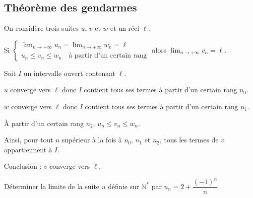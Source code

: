 \documentclass[french]{book}
\newcommand{\N}{\mathbb {N}}
\newcommand{\ie}{\leq}
\newcommand{\limn}{\lim_{n\rightarrow +\infty}}
\begin{document}
\subsection{Théorème des gendarmes}

\begin{prop}
On considère trois suites $u$, $v$ et $w$ et un réel $\ell$.
\par Si \quad
$\left\{\begin{array}{l}
\limn u_{n}=\limn w_{n}=\ell \\
u_{n} \ie v_{n} \ie w_{n} \quad \text{à partir d'un certain rang}
\end{array}\right.
$
\qquad alors \quad $\limn v_{n}=\ell$.
\end{prop}

\begin{demo}
Soit $I$ un intervalle ouvert contenant $\ell$.
\par $u$ converge vers $\ell$ donc $I$ contient tous ses termes à partir d'un certain rang $n_{0}$.
\par $w$ converge vers $\ell$ donc $I$ contient tous ses termes à partir d'un certain rang $n_{1}$.
\par À partir d'un certain rang $n_{2}$, $u_{n} \ie v_{n} \ie w_{n}$.
\par Ainsi, pour tout $n$ supérieur à la fois à $n_{0}$, $n_{1}$ et $n_{2}$, tous les termes de $v$ appartiennent à $I$.
\par Conclusion : $v$ converge vers $\ell$.
\end{demo}

\newpage
\begin{exemple}
Déterminer la limite de la suite $u$ définie sur $\N^{*}$ par $u_{n}=2+\dfrac{(-1)^{n}}{n}$
\end{exemple}
\end{document}
